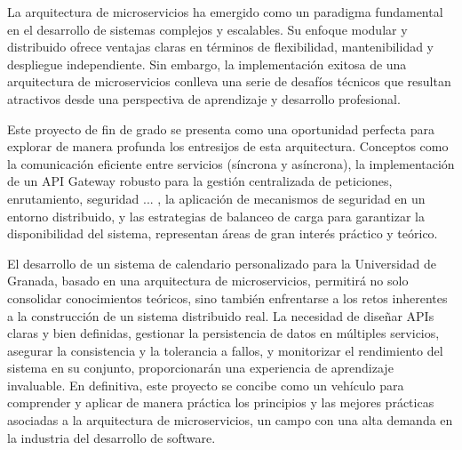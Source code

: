 
La arquitectura de microservicios ha emergido como un paradigma fundamental en el desarrollo de sistemas complejos y escalables. Su enfoque modular y distribuido ofrece ventajas claras en términos de flexibilidad, mantenibilidad y despliegue independiente. Sin embargo, la implementación exitosa de una arquitectura de microservicios conlleva una serie de desafíos técnicos que resultan atractivos desde una perspectiva de aprendizaje y desarrollo profesional.

Este proyecto de fin de grado se presenta como una oportunidad perfecta para explorar de manera profunda los entresijos de esta arquitectura. Conceptos como la comunicación eficiente entre servicios (síncrona y asíncrona), la implementación de un API Gateway robusto para la gestión centralizada de peticiones, enrutamiento, seguridad ... , la aplicación de mecanismos de seguridad en un entorno distribuido, y las estrategias de balanceo de carga para garantizar la disponibilidad del sistema, representan áreas de gran interés práctico y teórico.

El desarrollo de un sistema de calendario personalizado para la Universidad de Granada, basado en una arquitectura de microservicios, permitirá no solo consolidar conocimientos teóricos, sino también enfrentarse a los retos inherentes a la construcción de un sistema distribuido real. La necesidad de diseñar APIs claras y bien definidas, gestionar la persistencia de datos en múltiples servicios, asegurar la consistencia y la tolerancia a fallos, y monitorizar el rendimiento del sistema en su conjunto, proporcionarán una experiencia de aprendizaje invaluable. En definitiva, este proyecto se concibe como un vehículo para comprender y aplicar de manera práctica los principios y las mejores prácticas asociadas a la arquitectura de microservicios, un campo con una alta demanda en la industria del desarrollo de software.

